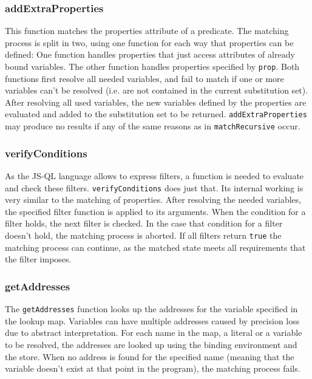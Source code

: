 \subsubsection{addExtraProperties}

This function matches the properties attribute of a predicate. The matching process is split in two, using one function for each way that properties can be defined: One function handles properties that just access attributes of already bound variables. The other function handles properties specified by \texttt{prop}. Both functions first resolve all needed variables, and fail to match if one or more variables can't be resolved (i.e. are not contained in the current substitution set). After resolving all used variables, the new variables defined by the properties are evaluated and added to the substitution set to be returned. \texttt{addExtraProperties} may produce no results if any of the same reasons as in \texttt{matchRecursive} occur.

\subsubsection{verifyConditions}

As the JS-QL language allows to express filters, a function is needed to evaluate and check these filters. \texttt{verifyConditions} does just that. Its internal working is very similar to the matching of properties. After resolving the needed variables, the specified filter function is applied to its arguments. When the condition for a filter holds, the next filter is checked. In the case that condition for a filter doesn't hold, the matching process is aborted. If all filters return \texttt{true} the matching process can continue, as the matched state meets all requirements that the filter imposes.

\subsubsection{getAddresses}
The \texttt{getAddresses} function looks up the addresses for the variable specified in the lookup map. Variables can have multiple addresses caused by precision loss due to abstract interpretation. For each name in the map, a literal or a variable to be resolved, the addresses are looked up using the binding environment and the store. When no address is found for the specified name (meaning that the variable doesn't exist at that point in the program), the matching process fails.

